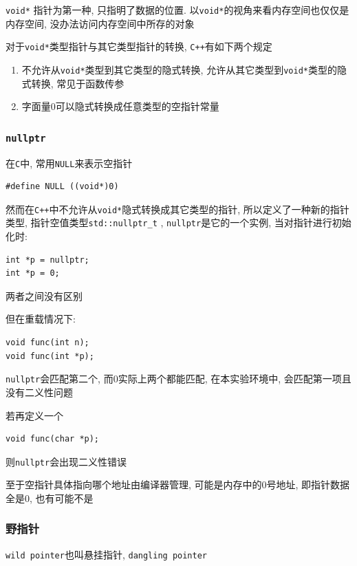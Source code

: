 {\tt void*} 指针为第一种, 只指明了数据的位置. 以{\tt void*}的视角来看内存空间也仅仅是内存空间, 没办法访问内存空间中所存的对象

对于{\tt void*}类型指针与其它类型指针的转换, {\tt C++}有如下两个规定
\begin{enumerate}
	\item 不允许从{\tt void*}类型到其它类型的隐式转换, 允许从其它类型到{\tt void*}类型的隐式转换, 常见于函数传参
	\item 字面量0可以隐式转换成任意类型的空指针常量
\end{enumerate}

\subsubsection{\tt{nullptr}}

在{\tt C}中, 常用{\tt NULL}来表示空指针
\begin{lstlisting}[xleftmargin=2em]
#define NULL ((void*)0)
\end{lstlisting}
然而在{\tt C++}中不允许从{\tt void*}隐式转换成其它类型的指针, 所以定义了一种新的指针类型, 指针空值类型{\tt std::nullptr\_t}
	, {\tt nullptr}是它的一个实例, 当对指针进行初始化时:
\begin{lstlisting}[xleftmargin=2em]
int *p = nullptr;
int *p = 0;
\end{lstlisting}
两者之间没有区别

\noindent 但在重载情况下:
\begin{lstlisting}[xleftmargin=2em]
void func(int n);
void func(int *p);
\end{lstlisting}
{\tt nullptr}会匹配第二个, 而0实际上两个都能匹配, 在本实验环境中, 会匹配第一项且没有二义性问题

\noindent 若再定义一个
\begin{lstlisting}[xleftmargin=2em]
void func(char *p);
\end{lstlisting}
则{\tt nullptr}会出现二义性错误

至于空指针具体指向哪个地址由编译器管理, 可能是内存中的0号地址, 即指针数据全是0, 也有可能不是


\subsubsection{野指针}

{\tt wild pointer}也叫悬挂指针, {\tt dangling pointer}

